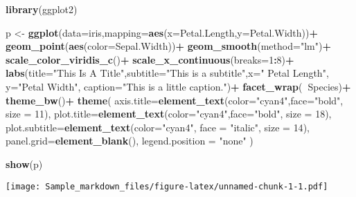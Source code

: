 \documentclass[]{article}
\newenvironment{Shaded}{\begin{snugshade}}{\end{snugshade}}
\newcommand{\DataTypeTok}[1]{\textcolor[rgb]{0.13,0.29,0.53}{#1}}
\newcommand{\DecValTok}[1]{\textcolor[rgb]{0.00,0.00,0.81}{#1}}
\newcommand{\KeywordTok}[1]{\textcolor[rgb]{0.13,0.29,0.53}{\textbf{#1}}}
\newcommand{\NormalTok}[1]{#1}
\newcommand{\OperatorTok}[1]{\textcolor[rgb]{0.81,0.36,0.00}{\textbf{#1}}}
\newcommand{\StringTok}[1]{\textcolor[rgb]{0.31,0.60,0.02}{#1}}
\begin{document}
\begin{Shaded}
\begin{Highlighting}[]
\KeywordTok{library}\NormalTok{(ggplot2)}

\NormalTok{p <-}\StringTok{ }\KeywordTok{ggplot}\NormalTok{(}\DataTypeTok{data=}\NormalTok{iris,}\DataTypeTok{mapping=}\KeywordTok{aes}\NormalTok{(}\DataTypeTok{x=}\NormalTok{Petal.Length,}\DataTypeTok{y=}\NormalTok{Petal.Width))}\OperatorTok{+}
\StringTok{  }\KeywordTok{geom_point}\NormalTok{(}\KeywordTok{aes}\NormalTok{(}\DataTypeTok{color=}\NormalTok{Sepal.Width))}\OperatorTok{+}
\StringTok{  }\KeywordTok{geom_smooth}\NormalTok{(}\DataTypeTok{method=}\StringTok{"lm"}\NormalTok{)}\OperatorTok{+}
\StringTok{  }\KeywordTok{scale_color_viridis_c}\NormalTok{()}\OperatorTok{+}
\StringTok{  }\KeywordTok{scale_x_continuous}\NormalTok{(}\DataTypeTok{breaks=}\DecValTok{1}\OperatorTok{:}\DecValTok{8}\NormalTok{)}\OperatorTok{+}
\StringTok{  }\KeywordTok{labs}\NormalTok{(}\DataTypeTok{title=}\StringTok{"This Is A Title"}\NormalTok{,}\DataTypeTok{subtitle=}\StringTok{"This is a subtitle"}\NormalTok{,}\DataTypeTok{x=}\StringTok{" Petal Length"}\NormalTok{, }
       \DataTypeTok{y=}\StringTok{"Petal Width"}\NormalTok{, }\DataTypeTok{caption=}\StringTok{"This is a little caption."}\NormalTok{)}\OperatorTok{+}
\StringTok{  }\KeywordTok{facet_wrap}\NormalTok{(}\OperatorTok{~}\NormalTok{Species)}\OperatorTok{+}
\StringTok{  }\KeywordTok{theme_bw}\NormalTok{()}\OperatorTok{+}
\StringTok{  }\KeywordTok{theme}\NormalTok{(}
    \DataTypeTok{axis.title=}\KeywordTok{element_text}\NormalTok{(}\DataTypeTok{color=}\StringTok{"cyan4"}\NormalTok{,}\DataTypeTok{face=}\StringTok{"bold"}\NormalTok{, }\DataTypeTok{size =} \DecValTok{11}\NormalTok{),}
    \DataTypeTok{plot.title=}\KeywordTok{element_text}\NormalTok{(}\DataTypeTok{color=}\StringTok{"cyan4"}\NormalTok{,}\DataTypeTok{face=}\StringTok{"bold"}\NormalTok{, }\DataTypeTok{size =} \DecValTok{18}\NormalTok{),}
    \DataTypeTok{plot.subtitle=}\KeywordTok{element_text}\NormalTok{(}\DataTypeTok{color=}\StringTok{"cyan4"}\NormalTok{, }\DataTypeTok{face =} \StringTok{"italic"}\NormalTok{, }\DataTypeTok{size =} \DecValTok{14}\NormalTok{),}
    \DataTypeTok{panel.grid=}\KeywordTok{element_blank}\NormalTok{(),}
    \DataTypeTok{legend.position =} \StringTok{"none"}
\NormalTok{  )}

\KeywordTok{show}\NormalTok{(p)}
\end{Highlighting}
\end{Shaded}

\texttt{[image: Sample\_markdown\_files/figure-latex/unnamed-chunk-1-1.pdf]}
\end{document}
